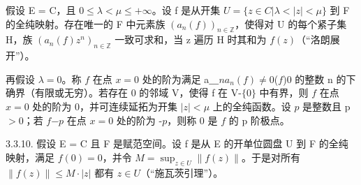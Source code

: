 假设 E = C，且 \(0 \leqslant \lambda < \mu \leqslant +\infty\)。设 f 是从开集 \(U = \{z \in C | \lambda < |z| < \mu\}\) 到 F 的全纯映射。存在唯一的 F 中元素族 \((a_{n}(f))_{n \in \mathbb{Z}}\)，使得对 U 的每个紧子集 H，族 \((a_{n}(f)z^{n})_{n \in \mathbb{Z}}\) 一致可求和，当 z 遍历 H 时其和为 \(f(z)\)（“洛朗展开”）。

再假设 \(\lambda=0\)。称 \(f\) 在点 \(x=0\) 处的阶为满足 a＿\(n\)\(a_{n}(f)\neq0\)(\(f\))0 的整数 n 的下确界（有限或无穷）。若存在 0 的邻域 V，使得 f 在 V-\(\{0\}\) 中有界，则 \(f\) 在点 \(x=0\) 处的阶为 0，并可连续延拓为开集 \(|z|<\mu\) 上的全纯函数。设 \(p\) 是整数且 p\(>0\)；若 \(f\)\(-p\) 在点 \(x=0\) 处的阶为 -\(p\)，则称 0 是 \(f\) 的 p 阶极点。

3.3.10. 假设 E = C 且 F 是赋范空间。设 f 是从 E 的开单位圆盘 U 到 F 的全纯映射，满足 \(f(0) = 0\)，并令 \(M = \sup_{z \in U} \|f(z)\|\)。于是对所有 \(\|f(z)\| \leqslant M \cdot |z|\) 都有 \(z \in U\)（“施瓦茨引理”）。


